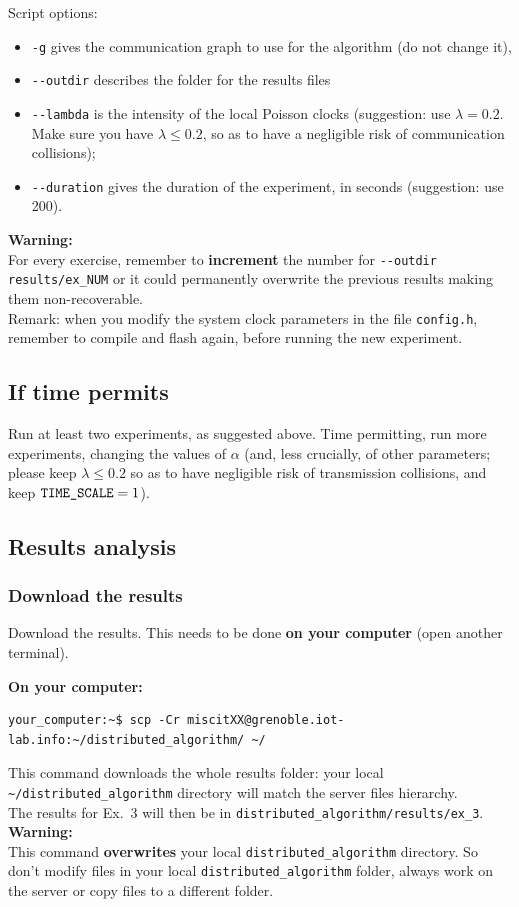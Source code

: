 \documentclass[oneside]{article}
\begin{document}
Script options:
\begin{itemize}
	\item \verb=-g= gives the communication graph to use for the algorithm (do not change it),
	\item \verb=--outdir= describes the folder for the results files
\item        \verb=--lambda= is the intensity of the local Poisson clocks (suggestion: use $\lambda = 0.2$. Make sure you have $\lambda \le 0.2$, so as to have a negligible risk of communication collisions);
\item        \verb=--duration= gives the duration of the experiment, in seconds (suggestion: use 200).
\end{itemize}
%
\textbf{Warning:} \\
For every exercise, remember to \textbf{increment} the number for \verb=--outdir results/ex_NUM=
or it could permanently overwrite the previous results making them non-recoverable.\\

Remark: when you modify the system clock parameters in the file \verb=config.h=, remember to compile and flash again, before running the new experiment.


\subsection{If time permits}
Run at least two experiments, as suggested above.
Time permitting, run more experiments, changing the values of $\alpha$
(and, less crucially, of other parameters; please keep  $\lambda \le 0.2$ so as to have negligible risk of transmission collisions, and keep
$\verb=TIME_SCALE= = 1$).

\subsection{Results analysis}
\subsubsection{Download the results}
Download the results. This needs to be done \textbf{on your computer} (open another terminal).

\textbf{On your computer:} 
\begin{verbatim}
your_computer:~$ scp -Cr miscitXX@grenoble.iot-lab.info:~/distributed_algorithm/ ~/
\end{verbatim}
This command downloads the whole results folder:
your local \verb=~/distributed_algorithm= directory will match the server files hierarchy.\\
The results for Ex.~3 will then be in \verb=distributed_algorithm/results/ex_3=.\\
\textbf{Warning:} \\ This command \textbf{overwrites} your local \verb=distributed_algorithm= directory. So don't modify files in your local \verb=distributed_algorithm= folder, always work on the server or copy files to a different folder.
\end{document}
